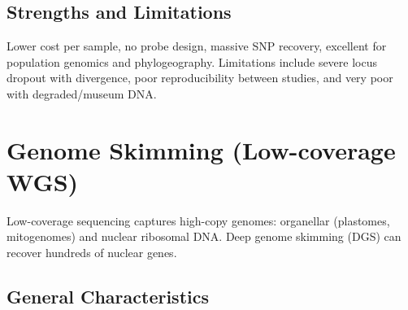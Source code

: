 \subsection{Strengths and Limitations}

Lower cost per sample, no probe design, massive SNP recovery, excellent for population genomics and phylogeography. Limitations include severe locus dropout with divergence, poor reproducibility between studies, and very poor with degraded/museum DNA.

\textcite{baird2008, peterson2012, eaton2020, huang2016}

\section{Genome Skimming (Low-coverage WGS)}

Low-coverage sequencing captures high-copy genomes: organellar (plastomes, mitogenomes) and nuclear ribosomal DNA. Deep genome skimming (DGS) can recover hundreds of nuclear genes.

\subsection{General Characteristics}

